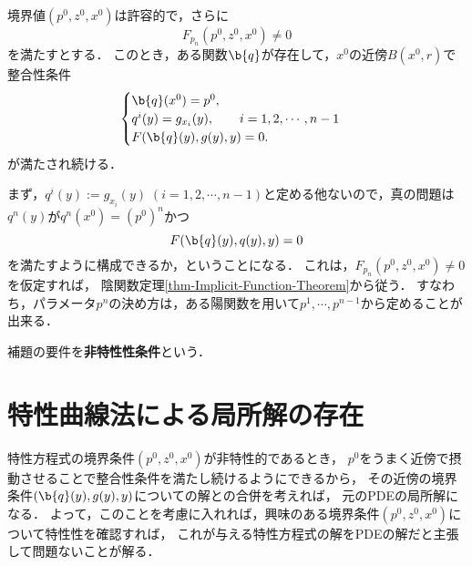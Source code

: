 \documentclass[uplatex,dvipdfmx]{jsreport}
\begin{document}
\begin{lemma}[摂動に対して境界データが許容的であり続けるための十分条件]
    境界値$(p^0,z^0,x^0)$は許容的で，さらに
    \[F_{p_n}(p^0,z^0,x^0)\ne0\]
    を満たすとする．
    このとき，ある関数$\b{q}$が存在して，$x^0$の近傍$B(x^0,r)$で整合性条件
    \[\begin{cases}
        \b{q}(x^0)=p^0,\\
        q^i(y)=g_{x_i}(y),\qquad i=1,2,\cdots,n-1\\
        F(\b{q}(y),g(y),y)=0.
    \end{cases}\]
    が満たされ続ける．
\end{lemma}
\begin{Proof}
    まず，$q^i(y):=g_{x_i}(y)\;(i=1,2,\cdots,n-1)$と定める他ないので，真の問題は$q^n(y)$が$q^n(x^0)=(p^0)^n$かつ
    \[F(\b{q}(y),q(y),y)=0\]
    を満たすように構成できるか，ということになる．
    これは，$F_{p_n}(p^0,z^0,x^0)\ne0$を仮定すれば，
    陰関数定理\ref{thm-Implicit-Function-Theorem}から従う．
    すなわち，パラメータ$p^n$の決め方は，ある陽関数を用いて$p^1,\cdots,p^{n-1}$から定めることが出来る．
\end{Proof}

\begin{definition}
    補題の要件を\textbf{非特性性条件}という．
\end{definition}

\section{特性曲線法による局所解の存在}

\begin{tcolorbox}[colframe=ForestGreen, colback=ForestGreen!10!white,breakable,colbacktitle=ForestGreen!40!white,coltitle=black,fonttitle=\bfseries\sffamily,
title=特性的な境界の近傍では局所解が存在する]
    特性方程式の境界条件$(p^0,z^0,x^0)$が非特性的であるとき，
    $p^0$をうまく近傍で摂動させることで整合性条件を満たし続けるようにできるから，
    その近傍の境界条件$(\b{q}(y),g(y),y)$についての解との合併を考えれば，
    元のPDEの局所解になる．
    よって，このことを考慮に入れれば，興味のある境界条件$(p^0,z^0,x^0)$について特性性を確認すれば，
    これが与える特性方程式の解をPDEの解だと主張して問題ないことが解る．
\end{tcolorbox}
\end{document}
